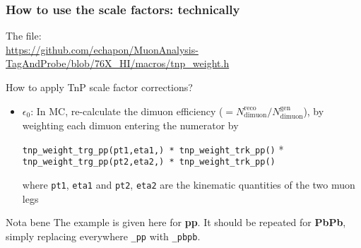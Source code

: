 \documentclass[9pt]{beamer}
\begin{document}
 \begin{frame}[plain]
  \frametitle{How to use the scale factors: technically}
  
  The file: \\\url{https://github.com/echapon/MuonAnalysis-TagAndProbe/blob/76X_HI/macros/tnp_weight.h}
  
  \begin{block}{How to apply TnP scale factor corrections?}
  \begin{itemize}
   \item \alert{$\epsilon_0$}: In MC, re-calculate the dimuon efficiency ($= N_\text{dimuon}^\text{reco}/N_\text{dimuon}^\text{gen}$), by weighting each dimuon entering the numerator by
   
   \vspace{10pt}
   
   \texttt{tnp\_weight\_trg\_pp(pt1,eta1,) * tnp\_weight\_trk\_pp()} *\\
   \texttt{tnp\_weight\_trg\_pp(pt2,eta2,) * tnp\_weight\_trk\_pp()}\\
   
   \vspace{10pt}
   
   where \texttt{pt1}, \texttt{eta1} and \texttt{pt2}, \texttt{eta2} are the kinematic quantities of the two muon legs
   \end{itemize}
  \end{block}
  
  \begin{alertblock}{Nota bene}
   The example is given here for \textbf{pp}. It should be repeated for \textbf{PbPb}, simply replacing everywhere \alert{\texttt{\_pp}} with \alert{\texttt{\_pbpb}}.
  \end{alertblock}


 \end{frame}
\end{document}
